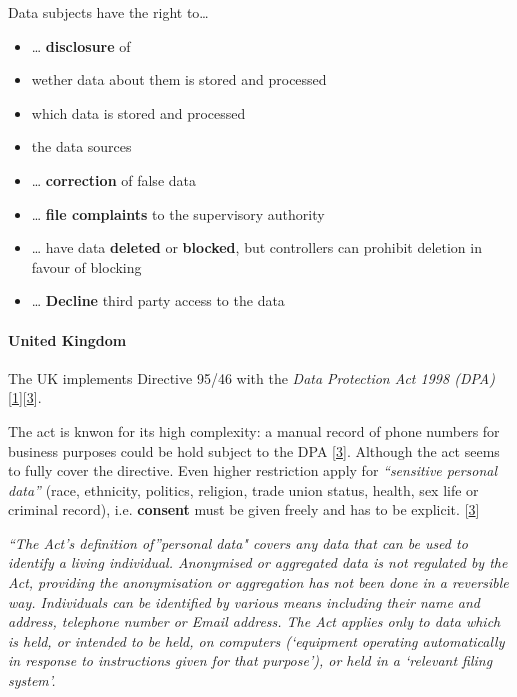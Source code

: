 Data subjects have the right to\ldots{}

\begin{itemize}
\itemsep1pt\parskip0pt
\item
  \ldots{} \textbf{disclosure} of
\item
  wether data about them is stored and processed
\item
  which data is stored and processed
\item
  the data sources
\item
  \ldots{} \textbf{correction} of false data
\item
  \ldots{} \textbf{file complaints} to the supervisory authority
\item
  \ldots{} have data \textbf{deleted} or \textbf{blocked}, but
  controllers can prohibit deletion in favour of blocking
\item
  \ldots{} \textbf{Decline} third party access to the data
\end{itemize}

\paragraph{United Kingdom}

The UK implements Directive 95/46 with the \emph{Data Protection Act
1998 (DPA)}
{[}\hyperref[references]{1}{]}{[}\hyperref[references]{3}{]}.

The act is knwon for its high complexity: a manual record of phone
numbers for business purposes could be hold subject to the DPA
{[}\hyperref[references]{3}{]}. Although the act seems to fully cover
the directive. Even higher restriction apply for \emph{``sensitive
personal data''} (race, ethnicity, politics, religion, trade union
status, health, sex life or criminal record), i.e. \textbf{consent} must
be given freely and has to be explicit. {[}\hyperref[references]{3}{]}

\emph{``The Act's definition of''personal data" covers any data that can
be used to identify a living individual. Anonymised or aggregated data
is not regulated by the Act, providing the anonymisation or aggregation
has not been done in a reversible way. Individuals can be identified by
various means including their name and address, telephone number or
Email address. The Act applies only to data which is held, or intended
to be held, on computers (`equipment operating automatically in response
to instructions given for that purpose'), or held in a `relevant filing
system'.}

